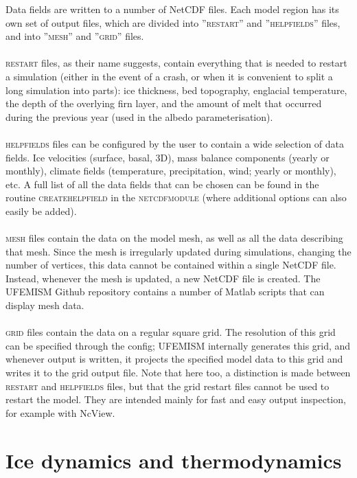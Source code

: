 \documentclass{article}
\begin{document}
Data fields are written to a number of NetCDF files. Each model region has its own set of output files, which are divided into ''\textsc{restart}'' and ''\textsc{help\textunderscore fields}'' files, and into ''\textsc{mesh}'' and ''\textsc{grid}'' files.\\
\\
\textsc{restart} files, as their name suggests, contain everything that is needed to restart a simulation (either in the event of a crash, or when it is convenient to split a long simulation into parts): ice thickness, bed topography, englacial temperature, the depth of the overlying firn layer, and the amount of melt that occurred during the previous year (used in the albedo parameterisation).\\
\\
\textsc{help\textunderscore fields} files can be configured by the user to contain a wide selection of data fields. Ice velocities (surface, basal, 3D), mass balance components (yearly or monthly), climate fields (temperature, precipitation, wind; yearly or monthly), etc. A full list of all the data fields that can be chosen can be found in the routine \textsc{create\textunderscore help\textunderscore field} in the \textsc{netcdf\textunderscore module} (where additional options can also easily be added).\\
\\
\textsc{mesh} files contain the data on the model mesh, as well as all the data describing that mesh. Since the mesh is irregularly updated during simulations, changing the number of vertices, this data cannot be contained within a single NetCDF file. Instead, whenever the mesh is updated, a new NetCDF file is created. The UFEMISM Github repository contains a number of Matlab scripts that can display mesh data.\\
\\
\textsc{grid} files contain the data on a regular square grid. The resolution of this grid can be specified through the config; UFEMISM internally generates this grid, and whenever output is written, it projects the specified model data to this grid and writes it to the grid output file. Note that here too, a distinction is made between \textsc{restart} and \textsc{help\textunderscore fields} files, but that the grid restart files cannot be used to restart the model. They are intended mainly for fast and easy output inspection, for example with NcView.

\newpage
\section{Ice dynamics and thermodynamics}
\end{document}
